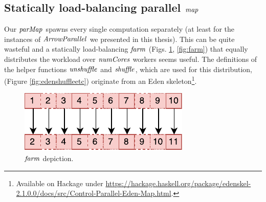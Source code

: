 \documentclass[paper=A4,twoside=true,openright,parskip=full,chapterprefix=true,headings=normal,bibliography=totoc,listof=totoc,titlepage=on,captions=tableabove,draft=false,british]{scrreprt}%
\begin{document}
\hypertarget{statically-load-balancing-parallel-map}{%
\subsection{\texorpdfstring{Statically load-balancing parallel
\ensuremath{\Varid{map}}}{Statically load-balancing parallel }}\label{statically-load-balancing-parallel-map}}

\label{sec:staticallyloadbalancing}

Our \ensuremath{\Varid{parMap}} spawns every single computation separately (at least for
the instances of \ensuremath{\Conid{ArrowParallel}} we presented in this thesis). This can
be quite wasteful and a statically load-balancing \ensuremath{\Varid{farm}} (Figs. \ref{fig:farmImg},
\ref{fig:farm}) that equally distributes the workload
over \ensuremath{\Varid{numCores}} workers seems useful. The definitions of the helper
functions \ensuremath{\Varid{unshuffle}} and \ensuremath{\Varid{shuffle}}, which are used for this
distribution, (Figure \ref{fig:edenshuffleetc}) originate from an Eden
skeleton\footnote{Available on Hackage under
  \url{https://hackage.haskell.org/package/edenskel-2.1.0.0/docs/src/Control-Parallel-Eden-Map.html}.}.

\begin{figure}[h]
\centering
\includegraphics{src/img/farmImg.pdf}
\caption{\ensuremath{\Varid{farm}} depiction.\label{fig:farmImg}}
\end{figure}
\end{document}
